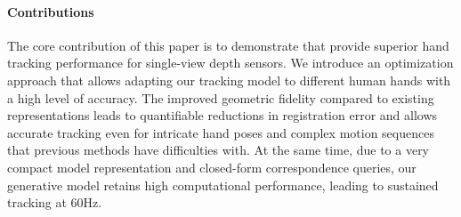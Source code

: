 \paragraph{Contributions}
%
The core contribution of this paper is to demonstrate that  provide superior hand tracking performance for single-view depth sensors. 
We introduce an optimization approach that allows adapting our tracking model to different human hands with a high level of accuracy. 
The improved geometric fidelity compared to existing representations leads to quantifiable reductions in registration error and allows accurate tracking even for intricate hand poses and complex motion sequences that previous methods have difficulties with. 
At the same time, due to a very compact model representation and closed-form correspondence queries, our generative model retains high computational performance, leading to sustained tracking at 60Hz.



